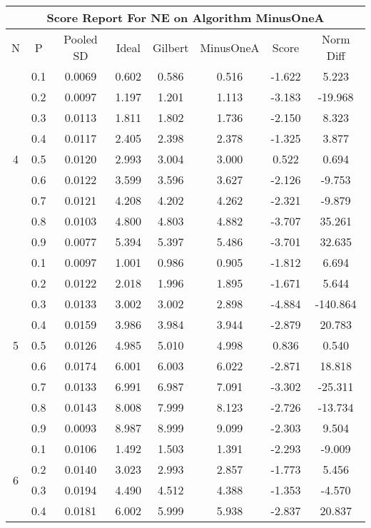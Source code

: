 \documentclass[11pt,a4paper]{report}
\begin{document}
\begin{longtable}{ | c | c || c | c | c | c | c | c | }
\hline
\multicolumn{8}{|c|}{ Score Report For NE on Algorithm MinusOneA} \\
\hline
N & P & Pooled SD &  Ideal &  Gilbert & MinusOneA  & Score & Norm Diff \\
 \hline
 \hline
 \endhead
\multirow{9}{*}{4} & 0.1 & 0.0069 & 0.602 & 0.586 & 0.516 & -1.622 & 5.223 \\
 & 0.2 & 0.0097 & 1.197 & 1.201 & 1.113 & -3.183 & -19.968 \\
 & 0.3 & 0.0113 & 1.811 & 1.802 & 1.736 & -2.150 & 8.323 \\
 & 0.4 & 0.0117 & 2.405 & 2.398 & 2.378 & -1.325 & 3.877 \\
 & 0.5 & 0.0120 & 2.993 & 3.004 & 3.000 & 0.522 & 0.694 \\
 & 0.6 & 0.0122 & 3.599 & 3.596 & 3.627 & -2.126 & -9.753 \\
 & 0.7 & 0.0121 & 4.208 & 4.202 & 4.262 & -2.321 & -9.879 \\
 & 0.8 & 0.0103 & 4.800 & 4.803 & 4.882 & -3.707 & 35.261 \\
 & 0.9 & 0.0077 & 5.394 & 5.397 & 5.486 & -3.701 & 32.635 \\
 \hline
\multirow{9}{*}{5} & 0.1 & 0.0097 & 1.001 & 0.986 & 0.905 & -1.812 & 6.694 \\
 & 0.2 & 0.0122 & 2.018 & 1.996 & 1.895 & -1.671 & 5.644 \\
 & 0.3 & 0.0133 & 3.002 & 3.002 & 2.898 & -4.884 & -140.864 \\
 & 0.4 & 0.0159 & 3.986 & 3.984 & 3.944 & -2.879 & 20.783 \\
 & 0.5 & 0.0126 & 4.985 & 5.010 & 4.998 & 0.836 & 0.540 \\
 & 0.6 & 0.0174 & 6.001 & 6.003 & 6.022 & -2.871 & 18.818 \\
 & 0.7 & 0.0133 & 6.991 & 6.987 & 7.091 & -3.302 & -25.311 \\
 & 0.8 & 0.0143 & 8.008 & 7.999 & 8.123 & -2.726 & -13.734 \\
 & 0.9 & 0.0093 & 8.987 & 8.999 & 9.099 & -2.303 & 9.504 \\
 \hline
\multirow{9}{*}{6} & 0.1 & 0.0106 & 1.492 & 1.503 & 1.391 & -2.293 & -9.009 \\
 & 0.2 & 0.0140 & 3.023 & 2.993 & 2.857 & -1.773 & 5.456 \\
 & 0.3 & 0.0194 & 4.490 & 4.512 & 4.388 & -1.353 & -4.570 \\
 & 0.4 & 0.0181 & 6.002 & 5.999 & 5.938 & -2.837 & 20.837 \\

\end{longtable}
\end{document}
